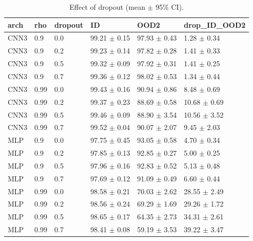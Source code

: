 \begin{table}[t]
\centering
\small
\caption{Effect of dropout (mean $\pm$ 95\% CI).}
\label{tab:dropout}
\begin{tabular}{llllll}
\toprule
arch & rho & dropout & ID & OOD2 & drop\_ID\_OOD2 \\
\midrule
CNN3 & 0.9 & 0.0 & 99.21 $\pm$ 0.15 & 97.93 $\pm$ 0.43 & 1.28 $\pm$ 0.34 \\
CNN3 & 0.9 & 0.2 & 99.23 $\pm$ 0.14 & 97.82 $\pm$ 0.28 & 1.41 $\pm$ 0.33 \\
CNN3 & 0.9 & 0.5 & 99.32 $\pm$ 0.09 & 97.92 $\pm$ 0.31 & 1.41 $\pm$ 0.25 \\
CNN3 & 0.9 & 0.7 & 99.36 $\pm$ 0.12 & 98.02 $\pm$ 0.53 & 1.34 $\pm$ 0.44 \\
CNN3 & 0.99 & 0.0 & 99.43 $\pm$ 0.16 & 90.94 $\pm$ 0.86 & 8.48 $\pm$ 0.69 \\
CNN3 & 0.99 & 0.2 & 99.37 $\pm$ 0.23 & 88.69 $\pm$ 0.58 & 10.68 $\pm$ 0.69 \\
CNN3 & 0.99 & 0.5 & 99.46 $\pm$ 0.09 & 88.90 $\pm$ 3.54 & 10.56 $\pm$ 3.52 \\
CNN3 & 0.99 & 0.7 & 99.52 $\pm$ 0.04 & 90.07 $\pm$ 2.07 & 9.45 $\pm$ 2.03 \\
MLP & 0.9 & 0.0 & 97.75 $\pm$ 0.45 & 93.05 $\pm$ 0.58 & 4.70 $\pm$ 0.34 \\
MLP & 0.9 & 0.2 & 97.85 $\pm$ 0.13 & 92.85 $\pm$ 0.27 & 5.00 $\pm$ 0.25 \\
MLP & 0.9 & 0.5 & 97.96 $\pm$ 0.16 & 92.83 $\pm$ 0.52 & 5.13 $\pm$ 0.48 \\
MLP & 0.9 & 0.7 & 97.69 $\pm$ 0.12 & 91.09 $\pm$ 0.49 & 6.60 $\pm$ 0.44 \\
MLP & 0.99 & 0.0 & 98.58 $\pm$ 0.21 & 70.03 $\pm$ 2.62 & 28.55 $\pm$ 2.49 \\
MLP & 0.99 & 0.2 & 98.56 $\pm$ 0.24 & 69.29 $\pm$ 1.69 & 29.26 $\pm$ 1.72 \\
MLP & 0.99 & 0.5 & 98.65 $\pm$ 0.17 & 64.35 $\pm$ 2.73 & 34.31 $\pm$ 2.61 \\
MLP & 0.99 & 0.7 & 98.41 $\pm$ 0.08 & 59.19 $\pm$ 3.53 & 39.22 $\pm$ 3.47 \\
\bottomrule
\end{tabular}
\end{table}